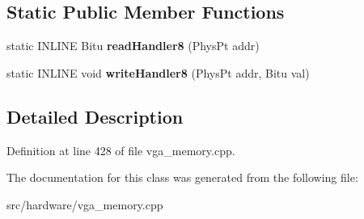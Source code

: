 \subsection*{Static Public Member Functions}
\begin{DoxyCompactItemize}
\item 
\hypertarget{classVGA__ET4000__ChainedVGA__Slow__Handler_aaaf88b1fe358e7af3b0411aa2a176fee}{static I\-N\-L\-I\-N\-E Bitu {\bfseries read\-Handler8} (Phys\-Pt addr)}\label{classVGA__ET4000__ChainedVGA__Slow__Handler_aaaf88b1fe358e7af3b0411aa2a176fee}

\item 
\hypertarget{classVGA__ET4000__ChainedVGA__Slow__Handler_ae2f914cb52258b4126058bfa4344198f}{static I\-N\-L\-I\-N\-E void {\bfseries write\-Handler8} (Phys\-Pt addr, Bitu val)}\label{classVGA__ET4000__ChainedVGA__Slow__Handler_ae2f914cb52258b4126058bfa4344198f}

\end{DoxyCompactItemize}


\subsection{Detailed Description}


Definition at line 428 of file vga\-\_\-memory.\-cpp.



The documentation for this class was generated from the following file\-:\begin{DoxyCompactItemize}
\item 
src/hardware/vga\-\_\-memory.\-cpp\end{DoxyCompactItemize}
